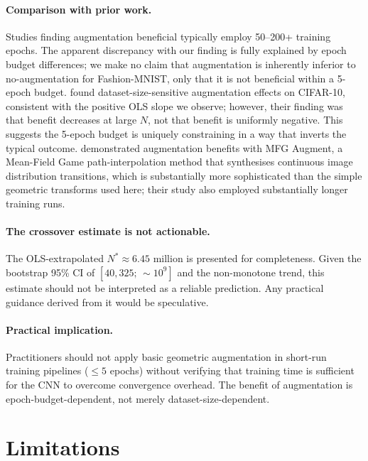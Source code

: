 \documentclass[11pt]{article}
\begin{document}
\paragraph{Comparison with prior work.}
Studies finding augmentation beneficial
\citep{pham2018deep,snider2023using,kumar2025enhancing} typically employ
50--200+ training epochs.
The apparent discrepancy with our finding is fully explained by epoch budget
differences; we make no claim that augmentation is inherently inferior to
no-augmentation for Fashion-MNIST, only that it is not beneficial within a
5-epoch budget.
\citet{karada2020empirical} found dataset-size-sensitive augmentation effects on
CIFAR-10, consistent with the positive OLS slope we observe; however, their
finding was that benefit decreases at large $N$, not that benefit is uniformly
negative.
This suggests the 5-epoch budget is uniquely constraining in a way that
inverts the typical outcome.
\citet{kang2024game} demonstrated augmentation benefits with MFG Augment, a
Mean-Field Game path-interpolation method that synthesises continuous image
distribution transitions, which is substantially more sophisticated than the
simple geometric transforms used here; their study also employed substantially
longer training runs.

\paragraph{The crossover estimate is not actionable.}
The OLS-extrapolated $N^\ast \approx 6.45$ million is presented for
completeness.
Given the bootstrap 95\% CI of $[40{,}325;\, {\sim}10^9]$ and the non-monotone
trend, this estimate should not be interpreted as a reliable prediction.
Any practical guidance derived from it would be speculative.

\paragraph{Practical implication.}
Practitioners should not apply basic geometric augmentation in short-run training
pipelines ($\leq 5$ epochs) without verifying that training time is sufficient
for the CNN to overcome convergence overhead.
The benefit of augmentation is epoch-budget-dependent, not merely
dataset-size-dependent.

\section{Limitations}
\label{sec:limitations}
\end{document}
